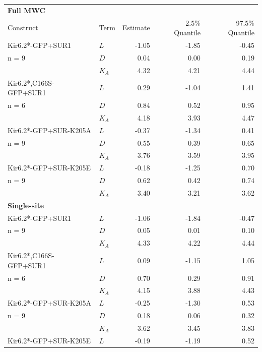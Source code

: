 \documentclass[10pt,lineno, doublespacing]{elife}
\begin{document}
\begin{table}
\centering\begingroup
\begin{tabular}{l l r r r}
\textbf{Full MWC} & & & & \\
Construct & Term & Estimate & 2.5\% Quantile & 97.5\% Quantile\\
\midrule
Kir6.2*-GFP+SUR1       & $L$     & -1.05 & -1.85 & -0.45 \\
n = 9                  & $D$     & 0.04  & 0.00  & 0.19  \\
                       & $K_{A}$ & 4.32  & 4.21  & 4.44  \\
\cmidrule{2-5}
Kir6.2*,C166S-GFP+SUR1 & $L$     & 0.29 & -1.04 & 1.41 \\
n = 6                  & $D$     & 0.84 & 0.52  & 0.95 \\
                       & $K_{A}$ & 4.18 & 3.93  & 4.47 \\
\cmidrule{2-5}
Kir6.2*-GFP+SUR-K205A  & $L$     & -0.37 & -1.34 & 0.41 \\
n = 9                  & $D$     & 0.55  & 0.39  & 0.65 \\
                       & $K_{A}$ & 3.76  & 3.59  & 3.95 \\
\cmidrule{2-5}
Kir6.2*-GFP+SUR-K205E  & $L$     & -0.18 & -1.25 & 0.70 \\
n = 9                  & $D$     & 0.62  & 0.42  & 0.74 \\
                       & $K_{A}$ & 3.40  & 3.21  & 3.62 \\
\cmidrule{2-5}
\textbf{Single-site} & & & & \\
\midrule
Kir6.2*-GFP+SUR1       & $L$     & -1.06 & -1.84 & -0.47 \\
n = 9                  & $D$     & 0.05  & 0.01  & 0.10  \\
                       & $K_{A}$ & 4.33  & 4.22  & 4.44  \\
\cmidrule{2-5}
Kir6.2*,C166S-GFP+SUR1 & $L$     & 0.09 & -1.15 & 1.05 \\
n = 6                  & $D$     & 0.70 & 0.29  & 0.91 \\
                       & $K_{A}$ & 4.15 & 3.88  & 4.43 \\
\cmidrule{2-5}
Kir6.2*-GFP+SUR-K205A  & $L$     & -0.25 & -1.30 & 0.53 \\
n = 9                  & $D$     & 0.18  & 0.06  & 0.32 \\
                       & $K_{A}$ & 3.62  & 3.45  & 3.83 \\
\cmidrule{2-5}
Kir6.2*-GFP+SUR-K205E  & $L$     & -0.19 & -1.19 & 0.52 \\

\end{tabular}
\end{table}
\end{document}
